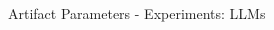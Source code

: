 \documentclass[en,16:9,smallfoot]{sdqbeamer}
\begin{document}
\begin{frame}{Artifact Parameters - Experiments: LLMs}
\begin{columns}
\begin{overlayarea}{\textwidth}{7cm}






\end{overlayarea}
\end{columns}
\end{frame}
\end{document}
